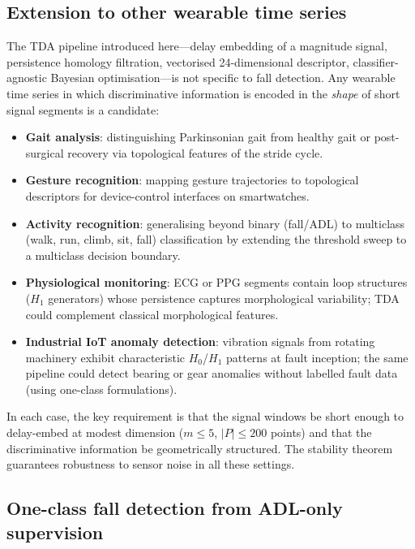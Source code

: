\subsection{Extension to other wearable time series}

The TDA pipeline introduced here---delay embedding of a magnitude signal,
persistence homology filtration, vectorised 24-dimensional descriptor,
classifier-agnostic Bayesian optimisation---is not specific to fall detection.
Any wearable time series in which discriminative information is encoded in the
\emph{shape} of short signal segments is a candidate:

\begin{itemize}
  \item \textbf{Gait analysis}: distinguishing Parkinsonian gait from healthy gait
    or post-surgical recovery via topological features of the stride cycle.
  \item \textbf{Gesture recognition}: mapping gesture trajectories to topological
    descriptors for device-control interfaces on smartwatches.
  \item \textbf{Activity recognition}: generalising beyond binary (fall/ADL) to
    multiclass (walk, run, climb, sit, fall) classification by extending the
    threshold sweep to a multiclass decision boundary.
  \item \textbf{Physiological monitoring}: ECG or PPG segments contain loop
    structures ($H_1$ generators) whose persistence captures morphological
    variability; TDA could complement classical morphological features.
  \item \textbf{Industrial IoT anomaly detection}: vibration signals from rotating
    machinery exhibit characteristic $H_0$/$H_1$ patterns at fault inception;
    the same pipeline could detect bearing or gear anomalies without labelled fault data
    (using one-class formulations).
\end{itemize}

In each case, the key requirement is that the signal windows be short enough to
delay-embed at modest dimension ($m\leq5$, $|P|\leq200$ points) and that the
discriminative information be geometrically structured.  The stability theorem
guarantees robustness to sensor noise in all these settings.

\subsection{One-class fall detection from ADL-only supervision}
\label{subsubsec:one-class}

